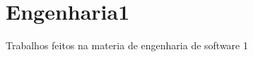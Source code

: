 \chapter{Engenharia1}
\hypertarget{md__r_e_a_d_m_e}{}\label{md__r_e_a_d_m_e}
\label{md__r_e_a_d_m_e_autotoc_md0}%
%
Trabalhos feitos na materia de engenharia de software 1 